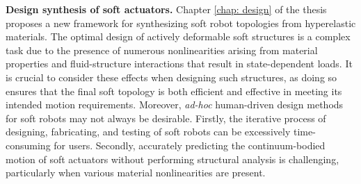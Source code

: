 


\textbf{Design synthesis of soft actuators.} Chapter \ref{chap: design} of the thesis proposes a new framework for synthesizing soft robot topologies from hyperelastic materials. The optimal design of actively deformable soft structures is a complex task due to the presence of numerous nonlinearities arising from material properties and fluid-structure interactions that result in state-dependent loads. It is crucial to consider these effects when designing such structures, as doing so ensures that the final soft topology is both efficient and effective in meeting its intended motion requirements. Moreover, \emph{ad-hoc} human-driven design methods for soft robots may not always be desirable. Firstly, the iterative process of designing, fabricating, and testing of soft robots can be excessively time-consuming for users. Secondly, accurately predicting the continuum-bodied motion of soft actuators without performing structural analysis is challenging, particularly when various material nonlinearities are present. %


